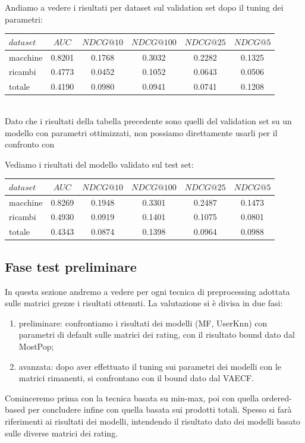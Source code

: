 Andiamo a vedere i risultati per dataset sul validation set dopo il tuning dei parametri:\\

\begin{tabular}{|l|c|cccc|}
    \toprule
    $dataset$ &    $AUC$ &  $NDCG@10$ & $NDCG@100$  & $NDCG@25$ & $NDCG@5$  \\
    \midrule
    macchine & 0.8201 & 0.1768 & 0.3032 & 0.2282 & 0.1325 \\
    ricambi & 0.4773 & 0.0452 & 0.1052 & 0.0643 & 0.0506 \\
    totale  & 0.4190 & 0.0980 & 0.0941 & 0.0741 & 0.1208 \\
\bottomrule
\end{tabular}\\

Dato che i risultati della tabella precedente sono quelli del validation set su un modello con parametri ottimizzati, non possiamo direttamente usarli per il confronto con 

Vediamo i risultati del modello validato sul test set:\\

\begin{tabular}{|l|c|cccc|}
    \toprule
    $dataset$ &    $AUC$ &  $NDCG@10$ & $NDCG@100$  & $NDCG@25$ & $NDCG@5$  \\
    \midrule
    macchine & 0.8269 &  0.1948 &   0.3301 &  0.2487 & 0.1473 \\
    ricambi  & 0.4930 &  0.0919 &   0.1401 &  0.1075 & 0.0801 \\
    totale  & 0.4343 &  0.0874 &   0.1398 &  0.0964 & 0.0988 \\

\bottomrule
\end{tabular}

\subsection{Fase test preliminare}
In questa sezione andremo a vedere per ogni tecnica di preprocessing adottata sulle matrici grezze i risultati ottenuti.
La valutazione si è divisa in due fasi: 
\begin{enumerate}
    \item preliminare: confrontiamo i risultati dei modelli (MF, UserKnn) con parametri di default sulle matrici dei rating, con il risultato bound dato dal MostPop;
    \item avanzata: dopo aver effettuato il tuning sui parametri dei modelli con le matrici rimanenti, si confrontano con il bound dato dal VAECF. 
\end{enumerate} 
Cominceremo prima con la tecnica basata su min-max, poi con quella ordered-based per concludere infine con quella basata sui prodotti totali. 
Spesso si farà riferimenti ai risultati dei modelli, intendendo il risultato dato dei modelli basato sulle diverse matrici dei rating.

